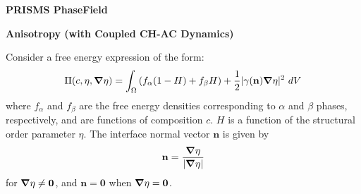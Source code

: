 \documentclass[10pt]{article}
\newcommand{\gv}[1]{\ensuremath{\mbox{\boldmath$ #1 $}}}
\newcommand{\grad}[1]{\gv{\nabla} #1}
\begin{document}
\def\Bomega{\mbox{\boldmath$\omega$}}
\def\Bvarepsilon{\mbox{\boldmath$\varepsilon$}}
\def\Bvartheta{\mbox{\boldmath$\vartheta$}}
\def\Bvarpi{\mbox{\boldmath$\varpi$}}
\def\Bvarrho{\mbox{\boldmath$\varrho$}}
\def\Bvarsigma{\mbox{\boldmath$\varsigma$}}
\def\Bvarphi{\mbox{\boldmath$\varphi$}}
\def\bone{\mathbf{1}}
\def\bzero{\mathbf{0}}
\def\bA{\mbox{\boldmath$ A$}}
\def\bB{\mbox{\boldmath$ B$}}
\def\bC{\mbox{\boldmath$ C$}}
\def\bD{\mbox{\boldmath$ D$}}
\def\bE{\mbox{\boldmath$ E$}}
\def\bF{\mbox{\boldmath$ F$}}
\def\bG{\mbox{\boldmath$ G$}}
\def\bH{\mbox{\boldmath$ H$}}
\def\bI{\mbox{\boldmath$ I$}}
\def\bJ{\mbox{\boldmath$ J$}}
\def\bK{\mbox{\boldmath$ K$}}
\def\bL{\mbox{\boldmath$ L$}}
\def\bM{\mbox{\boldmath$ M$}}
\def\bN{\mbox{\boldmath$ N$}}
\def\bO{\mbox{\boldmath$ O$}}
\def\bP{\mbox{\boldmath$ P$}}
\def\bQ{\mbox{\boldmath$ Q$}}
\def\bR{\mbox{\boldmath$ R$}}
\def\bS{\mbox{\boldmath$ S$}}
\def\bT{\mbox{\boldmath$ T$}}
\def\bU{\mbox{\boldmath$ U$}}
\def\bV{\mbox{\boldmath$ V$}}
\def\bW{\mbox{\boldmath$ W$}}
\def\bX{\mbox{\boldmath$ X$}}
\def\bY{\mbox{\boldmath$ Y$}}
\def\bZ{\mbox{\boldmath$ Z$}}
\def\ba{\mbox{\boldmath$ a$}}
\def\bb{\mbox{\boldmath$ b$}}
\def\bc{\mbox{\boldmath$ c$}}
\def\bd{\mbox{\boldmath$ d$}}
\def\be{\mbox{\boldmath$ e$}}
\def\bff{\mbox{\boldmath$ f$}}
\def\bg{\mbox{\boldmath$ g$}}
\def\bh{\mbox{\boldmath$ h$}}
\def\bi{\mbox{\boldmath$ i$}}
\def\bj{\mbox{\boldmath$ j$}}
\def\bk{\mbox{\boldmath$ k$}}
\def\bl{\mbox{\boldmath$ l$}}
\def\bm{\mbox{\boldmath$ m$}}
\def\bn{\mbox{\boldmath$ n$}}
\def\bo{\mbox{\boldmath$ o$}}
\def\bp{\mbox{\boldmath$ p$}}
\def\bq{\mbox{\boldmath$ q$}}
\def\br{\mbox{\boldmath$ r$}}
\def\bs{\mbox{\boldmath$ s$}}
\def\bt{\mbox{\boldmath$ t$}}
\def\bu{\mbox{\boldmath$ u$}}
\def\bv{\mbox{\boldmath$ v$}}
\def\bw{\mbox{\boldmath$ w$}}
\def\bx{\mbox{\boldmath$ x$}}
\def\by{\mbox{\boldmath$ y$}}
\def\bz{\mbox{\boldmath$ z$}}
\centerline{\Large{\bf PRISMS PhaseField}}
\smallskip
\centerline{\Large{\bf Anisotropy (with Coupled CH-AC Dynamics)}}
\bigskip

Consider a free energy expression of the form:
\begin{equation}
  \Pi(c, \eta, \grad  \eta) = \int_{\Omega}    \left( f_{\alpha}(1-H) + f_{\beta}H \right)  + \frac{1}{2} | \gamma( \mathbf{n} ) \grad  \eta |^2   ~dV 
\end{equation}
where $f_{\alpha}$ and $f_{\beta}$ are the free energy densities corresponding to $\alpha$ and $\beta$ phases, respectively, and are functions of composition $c$. $H$ is a function of the structural order parameter $\eta$.  The interface normal vector $\mathbf{n}$ is given by 
\begin{equation}
\mathbf{n} = \frac{\grad \eta}{|\grad \eta|}
\end{equation}
for $\grad \eta \ne \mathbf{0}$, and $\mathbf{n} = \mathbf{0}$ when $\grad \eta = \mathbf{0}$.
\end{document}
